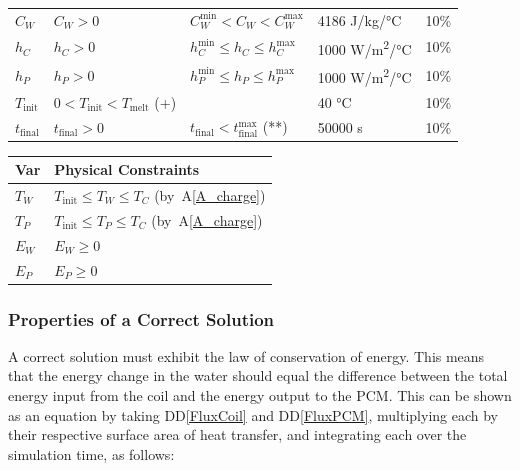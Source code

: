 \documentclass[12pt]{article}
\newcommand{\ddref}[1]{DD\ref{#1}}
\newcommand{\aref}[1]{A\ref{#1}}
\begin{document}
\begin{table}[!h]
\begin{longtable*}{l l l l c}
  \\
  $C_W$ & $C_W > 0$ & $C_W^{\text{min}} < C_W < C_W^{\text{max}}$ & 4186 
	\si[per-mode=symbol] {\joule\per\kilo\gram\per\celsius} & 10\%
  \\
  $h_C$ & $h_C > 0$ & $h_C^{\text{min}} \leq h_C \leq h_C^{\text{max}}$ 
	& 1000 \si[per-mode=symbol] {\watt\per\square\metre\per\celsius} & 10\%
  \\
  $h_P$ & $h_P > 0$ & $h_P^{\text{min}} \leq h_P \leq h_P^{\text{max}}$ 
	& 1000 \si[per-mode=symbol] {\watt\per\square\metre\per\celsius} & 10\%
  \\
  $T_\text{init}$ & $0 < T_\text{init} < T_\text{melt} $ (+) & & 40 \si[per-mode=symbol] {\celsius} & 10\%
  \\
  $t_\text{final}$ & $t_\text{final} > 0$ & $t_\text{final} < t_{\text{final}}^{\text{max}}$ (**) 
		& 50000 \si[per-mode=symbol] {\second} & 10\%
  \\
  \bottomrule
\end{longtable*}
\end{table}

\begin{table}[!h]
\caption{Output Data Constraints} \label{TblOutputVar}
\renewcommand{\arraystretch}{1.2}
\noindent \begin{longtable*}{l l} 
  \toprule
  \textbf{Var} & \textbf{Physical Constraints} \\
  \midrule 
  $T_W$ & $T_\text{init} \leq T_W \leq T_C$ (by~\aref{A_charge})
  \\
  $T_P$ & $T_\text{init} \leq T_P \leq T_C$ (by~\aref{A_charge})
  \\
  $E_W$ & $E_W \geq 0$
  \\
  $E_P$ & $E_P \geq 0$
  \\
  \bottomrule
\end{longtable*}
\end{table}

\subsubsection{Properties of a Correct Solution} \label{sec_CorrectSolution}

\noindent
A correct solution must exhibit the law of conservation of energy.
This means that the energy change in the water should equal the
difference between the total energy input from the coil and the energy
output to the PCM. This can be shown as an equation by taking \ddref{FluxCoil}
and \ddref{FluxPCM}, multiplying each by their respective surface area of
heat transfer, and integrating each over the simulation time, as follows:
\end{document}
